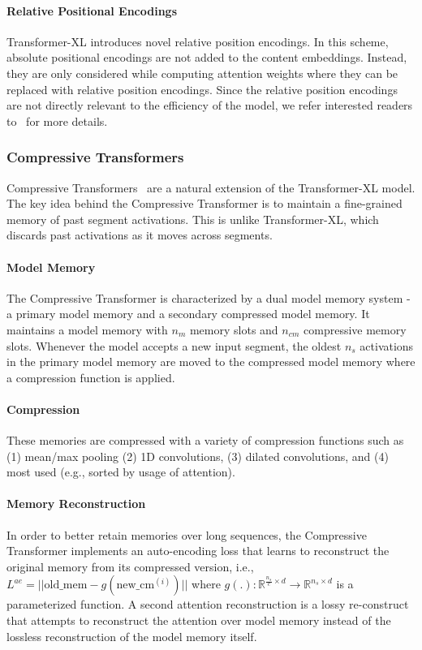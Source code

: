 \paragraph{Relative Positional Encodings} Transformer-XL introduces novel relative position encodings. In this scheme, absolute positional encodings are not added to the content embeddings. Instead, they are only considered while computing attention weights where they can be replaced with relative position encodings. Since the relative position encodings are not directly relevant to the efficiency of the model, we refer interested readers to~\citet{dai2019transformer} for more details. 

\subsubsection{Compressive Transformers} Compressive Transformers~\citep{rae2020compressive} are a natural extension of the Transformer-XL model. The key idea behind the Compressive Transformer is to maintain a fine-grained memory of past segment activations. This is unlike Transformer-XL, which discards past activations as it moves across segments. 
\paragraph{Model Memory} The Compressive Transformer is characterized by a dual model memory system - a primary model memory and a secondary compressed model memory. It maintains a model memory with $n_m$ memory slots and $n_{cm}$ compressive memory slots. Whenever the model accepts a new input segment, the oldest $n_s$ activations in the primary model memory are moved to the compressed model memory where a compression function is applied. 

\paragraph{Compression} These memories are compressed with a variety of compression functions such as (1) mean/max pooling (2) 1D convolutions, (3) dilated convolutions, and (4) most used (e.g., sorted by usage of attention).  
\paragraph{Memory Reconstruction} In order to better retain memories over long sequences, the Compressive Transformer implements an auto-encoding loss that learns to reconstruct the original memory from its compressed version, i.e., $L^{ae}=|| \text{old\_mem} - g(\text{new\_cm}^{(i)})||$ where $g(.) : \mathbb{R}^{\frac{n_s}{c} \times d} \rightarrow \mathbb{R}^{n_s \times d}$ is a parameterized function. A second attention reconstruction is a lossy re-construct that attempts to reconstruct the attention over model memory instead of the lossless reconstruction of the model memory itself. 

